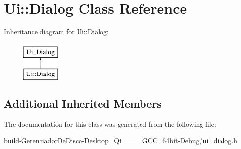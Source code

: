 \hypertarget{classUi_1_1Dialog}{}\section{Ui\+:\+:Dialog Class Reference}
\label{classUi_1_1Dialog}
Inheritance diagram for Ui\+:\+:Dialog\+:\begin{figure}[H]
\begin{center}
\leavevmode
\includegraphics[height=2.000000cm]{classUi_1_1Dialog}
\end{center}
\end{figure}
\subsection*{Additional Inherited Members}


The documentation for this class was generated from the following file\+:\begin{DoxyCompactItemize}
\item 
build-\/\+Gerenciador\+De\+Disco-\/\+Desktop\+\_\+\+Qt\+\_\+\_\+\_\+\_\+\+G\+C\+C\+\_\+64bit-\/\+Debug/ui\+\_\+dialog.\+h\end{DoxyCompactItemize}
